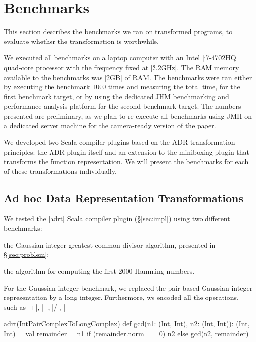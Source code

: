 \section{Benchmarks}
\label{sec:benchmarks}

This section describes the benchmarks we ran on transformed programs, to evaluate whether the transformation is worthwhile.

We executed all benchmarks on a laptop computer with an Intel |i7-4702HQ| quad-core processor with the frequency fixed at |2.2GHz|. The RAM memory available to the benchmarks was |2GB| of RAM. The benchmarks were ran either by executing the benchmark 1000 times and measuring the total time, for the first benchmark target, or by using the dedicated JHM benchmarking and performance analysis platform \cite{aleksey_shipilev_openjdk:_????} for the second benchmark target. The numbers presented are preliminary, as we plan to re-execute all benchmarks using JMH on a dedicated server machine for the camera-ready version of the paper.

We developed two Scala compiler plugins based on the ADR transformation principles: the ADR plugin itself and an extension to the miniboxing plugin \cite{miniboxing} that transforms the function representation. We will present the benchmarks for each of these transformations individually.

\subsection{Ad hoc Data Representation Transformations}
\label{sec:benchmarks:ad-hoc}

We tested the |adrt| Scala compiler plugin (\S\ref{sec:impl}) using two different benchmarks:

\begin{compactitem}
\item the Gaussian integer greatest common divisor algorithm, presented in \S\ref{sec:problem};
\item the algorithm for computing the first 2000 Hamming numbers.
\end{compactitem}

For the Gaussian integer benchmark, we replaced the pair-based Gaussian integer representation by a long integer. Furthermore, we encoded all the operations, such as |+|, |-|, |/|, |%

\begin{lstlisting-nobreak}
adrt(IntPairComplexToLongComplex) {
  def gcd(n1: (Int, Int), n2: (Int, Int)): (Int, Int) = {
    val remainder = n1 %
    if (remainder.norm == 0) n2 else gcd(n2, remainder)
  }
}
\end{lstlisting-nobreak}

